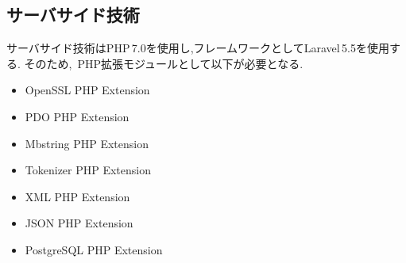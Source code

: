 \documentclass[a4paper]{ltjsarticle}
\begin{document}
    \subsection{サーバサイド技術}
        サーバサイド技術はPHP\,7.0を使用し,フレームワークとしてLaravel\,5.5を使用する.
        そのため,\, PHP拡張モジュールとして以下が必要となる.
        \begin{itemize}
            \item OpenSSL PHP Extension
            \item PDO PHP Extension
            \item Mbstring PHP Extension
            \item Tokenizer PHP Extension
            \item XML PHP Extension
            \item JSON PHP Extension
            \item PostgreSQL PHP Extension
        \end{itemize}
\end{document}
